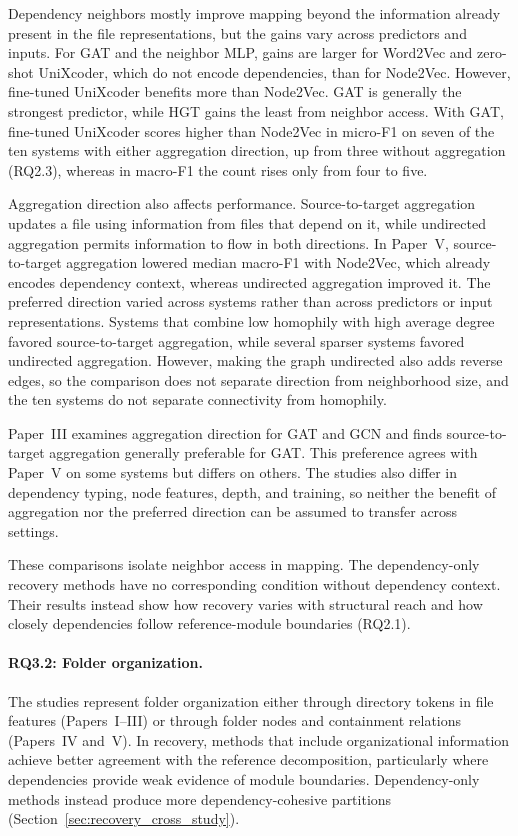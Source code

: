 Dependency neighbors mostly improve mapping beyond the information already present in the file representations, but the gains vary across predictors and inputs. For GAT and the neighbor MLP, gains are larger for Word2Vec and zero-shot UniXcoder, which do not encode dependencies, than for Node2Vec. However, fine-tuned UniXcoder benefits more than Node2Vec. GAT is generally the strongest predictor, while HGT gains the least from neighbor access. With GAT, fine-tuned UniXcoder scores higher than Node2Vec in micro-F1 on seven of the ten systems with either aggregation direction, up from three without aggregation (RQ2.3), whereas in macro-F1 the count rises only from four to five.

Aggregation direction also affects performance. Source-to-target aggregation updates a file using information from files that depend on it, while undirected aggregation permits information to flow in both directions. In Paper~V, source-to-target aggregation lowered median macro-F1 with Node2Vec, which already encodes dependency context, whereas undirected aggregation improved it. The preferred direction varied across systems rather than across predictors or input representations. Systems that combine low homophily with high average degree favored source-to-target aggregation, while several sparser systems favored undirected aggregation. However, making the graph undirected also adds reverse edges, so the comparison does not separate direction from neighborhood size, and the ten systems do not separate connectivity from homophily.

Paper~III examines aggregation direction for GAT and GCN and finds source-to-target aggregation generally preferable for GAT. This preference agrees with Paper~V on some systems but differs on others. The studies also differ in dependency typing, node features, depth, and training, so neither the benefit of aggregation nor the preferred direction can be assumed to transfer across settings.

These comparisons isolate neighbor access in mapping. The dependency-only recovery methods have no corresponding condition without dependency context. Their results instead show how recovery varies with structural reach and how closely dependencies follow reference-module boundaries (RQ2.1).

\paragraph{RQ3.2: Folder organization.} The studies represent folder organization either through directory tokens in file features (Papers~I--III) or through folder nodes and containment relations (Papers~IV and~V). In recovery, methods that include organizational information achieve better agreement with the reference decomposition, particularly where dependencies provide weak evidence of module boundaries. Dependency-only methods instead produce more dependency-cohesive partitions (Section~\ref{sec:recovery_cross_study}).

